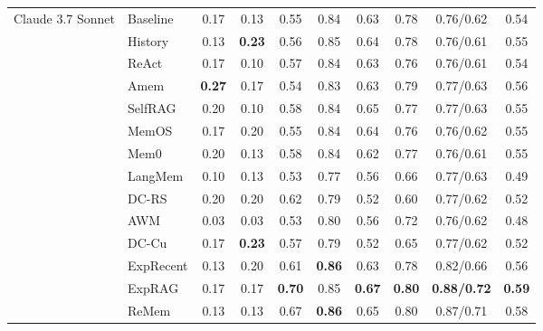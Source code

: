 \begin{table}[t!]
{\begin{tabular}{l l*{8}{c}}
\multirow{15}{*}{Claude 3.7 Sonnet}
 & Baseline            & 0.17 & 0.13 & 0.55 & 0.84 & 0.63 & 0.78 & 0.76/0.62 & 0.54 \\
 & History       & 0.13 & \textbf{0.23} & 0.56 & 0.85 & 0.64 & 0.78 & 0.76/0.61 & 0.55 \\
\cmidrule(lr){2-10}
 & ReAct                     & 0.17 & 0.10 & 0.57 & 0.84 & 0.63 & 0.76 & 0.76/0.61 & 0.54 \\
 & Amem                      & \textbf{0.27} & 0.17 & 0.54 & 0.83 & 0.63 & 0.79 & 0.77/0.63 & 0.56 \\
\cmidrule(lr){2-10}
 & SelfRAG                   & 0.20 & 0.10 & 0.58 & 0.84 & 0.65 & 0.77 & 0.77/0.63 & 0.55 \\
 & MemOS                     & 0.17 & 0.20 & 0.55 & 0.84 & 0.64 & 0.76 & 0.76/0.62 & 0.55 \\
 & Mem0                      & 0.20 & 0.13 & 0.58 & 0.84 & 0.62 & 0.77 & 0.76/0.61 & 0.55 \\
 & LangMem                   & 0.10 & 0.13 & 0.53 & 0.77 & 0.56 & 0.66 & 0.77/0.63 & 0.49 \\
\cmidrule(lr){2-10}
 & DC-RS                     & 0.20 & 0.20 & 0.62 & 0.79 & 0.52 & 0.60 & 0.77/0.62 & 0.52 \\
 & AWM                       & 0.03 & 0.03 & 0.53 & 0.80 & 0.56 & 0.72 & 0.76/0.62 & 0.48 \\
 & DC-Cu                     & 0.17 & \textbf{0.23} & 0.57 & 0.79 & 0.52 & 0.65 & 0.77/0.62 & 0.52 \\
\cmidrule(lr){2-10}
 & ExpRecent                 & 0.13 & 0.20 & 0.61 & \textbf{0.86} & 0.63 & 0.78 & 0.82/0.66 & 0.56 \\
 & ExpRAG                    & 0.17 & 0.17 & \textbf{0.70} & 0.85 & \textbf{0.67} & \textbf{0.80} & \textbf{0.88/0.72} & \textbf{0.59} \\
 & ReMem                     & 0.13 & 0.13 & 0.67 & \textbf{0.86} & 0.65 & 0.80 & 0.87/0.71 & 0.58 \\
\midrule



\end{tabular}}
\end{table}
